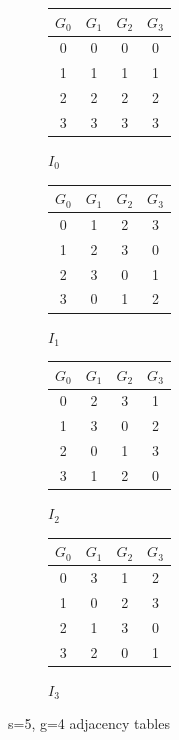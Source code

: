 \documentclass[11pt, oneside]{article} 	%
\begin{document}
\begin{figure}[!htb]
\begin{subfigure}{.25\textwidth}
\begin{tabular}{||c c c c||} 
 \hline
$G_0$  & $G_1$ & $G_2$ & $G_3$ \\ [0.5ex] 
 \hline\hline
 0 & 0 & 0 & 0 \\ 
 \hline
 1 & 1 & 1 & 1 \\
 \hline
 2 & 2 & 2  & 2 \\
 \hline
 3 & 3  & 3 & 3 \\
 \hline
\end{tabular}
\caption{$I_0$}
\end{subfigure}
\begin{subfigure}{.25\textwidth}
\begin{tabular}{||c c c c||} 
 \hline
$G_0$  & $G_1$ & $G_2$ & $G_3$ \\ [0.5ex] 
 \hline\hline
 0 & 1 &  2 & 3 \\ 
 \hline
 \cellcolor{green} 1 & \cellcolor{green}  2 &  \cellcolor{green} 3 &  \cellcolor{green} 0 \\
 \hline
 2 & 3 & 0  & 1 \\
 \hline
 3 & 0  & 1 & 2 \\
 \hline
\end{tabular}
\caption{$I_1$}
\end{subfigure}
\begin{subfigure}{.25\textwidth}
\begin{tabular}{||c c c c||} 
 \hline
$G_0$  & $G_1$ & $G_2$ & $G_3$ \\ [0.5ex] 
 \hline\hline
 0 & 2 & 3 & 1 \\ 
 \hline
 1 & 3 & 0 & 2 \\
 \hline
 2 & 0 & 1  & 3 \\
 \hline
 3 & 1  & 2 & 0 \\
 \hline
\end{tabular}
\caption{$I_2$}
\end{subfigure}
\begin{subfigure}{.25\textwidth}
\begin{tabular}{||c c c c||} 
 \hline
$G_0$  & $G_1$ & $G_2$ & $G_3$ \\ [0.5ex] 
 \hline\hline
 0 & 3 & 1 & 2 \\ 
 \hline
 1 & 0 & 2 & 3 \\
 \hline
 2 & 1 & 3  & 0 \\
 \hline
 3 & 2  & 0 & 1 \\
 \hline
\end{tabular}
\caption{$I_3$}
\end{subfigure}
\caption{s=5, g=4 adjacency tables}
\end{figure}
\end{document}
